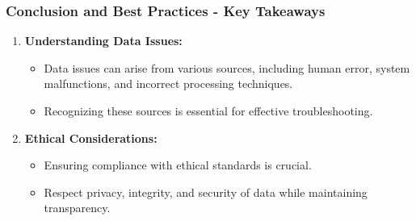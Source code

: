 \documentclass{beamer}
\begin{document}
\begin{frame}[fragile]
    \frametitle{Conclusion and Best Practices - Key Takeaways}
    
    \begin{enumerate}
        \item \textbf{Understanding Data Issues:}
        \begin{itemize}
            \item Data issues can arise from various sources, including human error, system malfunctions, and incorrect processing techniques.
            \item Recognizing these sources is essential for effective troubleshooting.
        \end{itemize}
        
        \item \textbf{Ethical Considerations:}
        \begin{itemize}
            \item Ensuring compliance with ethical standards is crucial.
            \item Respect privacy, integrity, and security of data while maintaining transparency.
        \end{itemize}
    \end{enumerate}
\end{frame}
\end{document}
